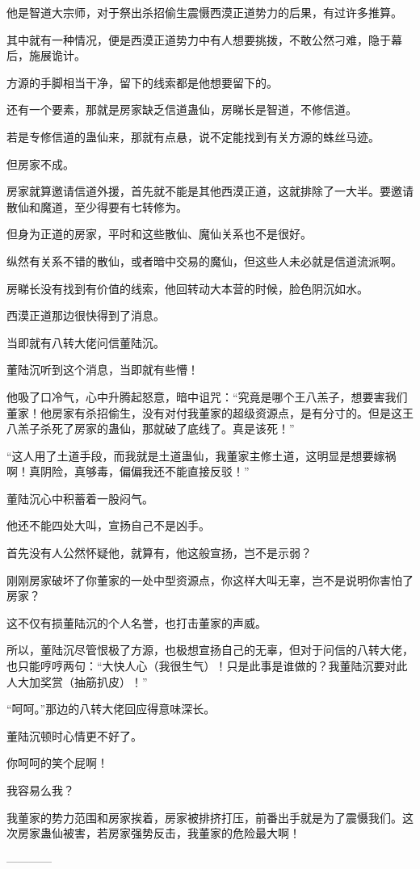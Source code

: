 \begin{this_body}
他是智道大宗师，对于祭出杀招偷生震慑西漠正道势力的后果，有过许多推算。

其中就有一种情况，便是西漠正道势力中有人想要挑拨，不敢公然刁难，隐于幕后，施展诡计。

方源的手脚相当干净，留下的线索都是他想要留下的。

还有一个要素，那就是房家缺乏信道蛊仙，房睇长是智道，不修信道。

若是专修信道的蛊仙来，那就有点悬，说不定能找到有关方源的蛛丝马迹。

但房家不成。

房家就算邀请信道外援，首先就不能是其他西漠正道，这就排除了一大半。要邀请散仙和魔道，至少得要有七转修为。

但身为正道的房家，平时和这些散仙、魔仙关系也不是很好。

纵然有关系不错的散仙，或者暗中交易的魔仙，但这些人未必就是信道流派啊。

房睇长没有找到有价值的线索，他回转动大本营的时候，脸色阴沉如水。

西漠正道那边很快得到了消息。

当即就有八转大佬问信董陆沉。

董陆沉听到这个消息，当即就有些懵！

他吸了口冷气，心中升腾起怒意，暗中诅咒：“究竟是哪个王八羔子，想要害我们董家！他房家有杀招偷生，没有对付我董家的超级资源点，是有分寸的。但是这王八羔子杀死了房家的蛊仙，那就破了底线了。真是该死！”

“这人用了土道手段，而我就是土道蛊仙，我董家主修土道，这明显是想要嫁祸啊！真阴险，真够毒，偏偏我还不能直接反驳！”

董陆沉心中积蓄着一股闷气。

他还不能四处大叫，宣扬自己不是凶手。

首先没有人公然怀疑他，就算有，他这般宣扬，岂不是示弱？

刚刚房家破坏了你董家的一处中型资源点，你这样大叫无辜，岂不是说明你害怕了房家？

这不仅有损董陆沉的个人名誉，也打击董家的声威。

所以，董陆沉尽管恨极了方源，也极想宣扬自己的无辜，但对于问信的八转大佬，也只能哼哼两句：“大快人心（我很生气）！只是此事是谁做的？我董陆沉要对此人大加奖赏（抽筋扒皮）！”

“呵呵。”那边的八转大佬回应得意味深长。

董陆沉顿时心情更不好了。

你呵呵的笑个屁啊！

我容易么我？

我董家的势力范围和房家挨着，房家被排挤打压，前番出手就是为了震慑我们。这次房家蛊仙被害，若房家强势反击，我董家的危险最大啊！

------------

\end{this_body}


